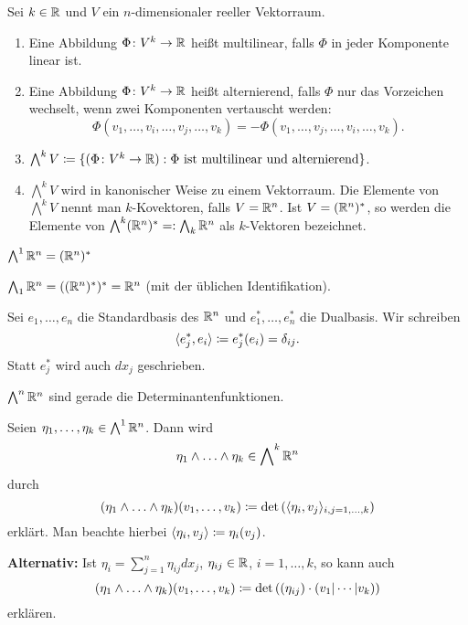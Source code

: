 \documentclass[a4paper,twoside,DIV15,BCOR12mm]{scrbook}
\newcommand{\bw}{\bigwedge\nolimits}
\begin{document}
\begin{definition}
Sei $k\in \mathbb{R}$ und $V$ ein $n$-dimensionaler reeller Vektorraum.
\begin{enumerate}
\item Eine Abbildung $\Phi\colon V^k\to \mathbb{R}$ heißt multilinear, falls $\Phi$ in jeder Komponente linear ist.
\item Eine Abbildung $\Phi\colon V^k\to\mathbb{R}$ heißt alternierend, falls $\Phi$ nur das Vorzeichen wechselt, wenn zwei Komponenten vertauscht werden:
\[
\Phi(v_1,\ldots,v_i,\ldots,v_j,\ldots,v_k) = -\Phi(v_1,\ldots,v_j,\ldots,v_i,\ldots,v_k).
\]
\item $\bw^k V \da\{ (\Phi\colon V^k\to \MdR) : \Phi \text{ ist multilinear und alternierend}\}$.
\item $\bw^k V$ wird in kanonischer Weise zu einem Vektorraum. Die Elemente von $\bw^k V$ nennt man $k$-Kovektoren, falls $V=\mathbb{R}^n$. Ist $V=(\mathbb{R}^n)^*$, so werden die Elemente von $\bw^k (\MdR^n)^* =:  \bw_k\MdR^n$ als $k$-Vektoren bezeichnet.
\end{enumerate}
\end{definition}

\begin{bemerkungen}
\item $\bw^1\MdR^n = (\MdR^n)^*$
\item $\bw_1\MdR^n = ((\MdR^n)^*)^* =\MdR^n$ (mit der üblichen Identifikation).
\item Sei $e_1,\ldots,e_n$ die Standardbasis des $\mathbb{R}^n$ und $e_1^*,\ldots,e_n^*$ die Dualbasis. Wir schreiben
\[
\langle e_j^*,e_i\rangle \da e_j^*(e_i)  =\delta_{ij}.
\]
Statt $e_j^*$ wird auch $d{x_j}$ geschrieben.
\item $\bw^n\MdR^n$ sind gerade die Determinantenfunktionen.
\end{bemerkungen}

\begin{definition}
Seien $\eta_1,\ldots,\eta_k\in \bw^1\MdR^n$. Dann wird
\[
\eta_1\wedge \ldots\wedge \eta_k \in \bw^k\MdR^n
\]
durch
\[
(\eta_1\wedge \ldots\wedge \eta_k)(v_1,\ldots,v_k) \da \det\left( \langle \eta_i,v_j\rangle_{i,j=1,\ldots,k}\right)
\]
erklärt. Man beachte hierbei $\langle\eta_i,v_j\rangle\da \eta_i(v_j)$.

\textbf{Alternativ:} Ist $\eta_i = \sum_{j=1}^n \eta_{ij} dx_j$, $\eta_{ij}\in \mathbb{R}$, $i=1,\ldots,k$, so kann auch 
\[
(\eta_1\wedge \ldots\wedge \eta_k)(v_1,\ldots,v_k) \da \det\left( (\eta_{ij})\cdot(v_1|\cdots|v_k) \right)
\]
erklären.
\end{definition}
\end{document}

